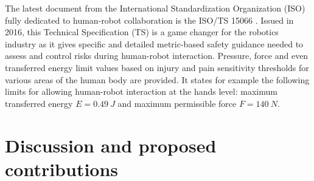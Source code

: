 The latest document from the International Standardization Organization (ISO) fully dedicated to human-robot collaboration is the ISO/TS 15066 \cite{ISO15066PDF}. Issued in 2016, this Technical Specification (TS) is a game changer for the robotics industry as it gives specific and detailed metric-based safety guidance needed to assess and control risks during human-robot interaction. Pressure, force and even transferred energy limit values based on injury and pain sensitivity thresholds for various areas of the human body are provided. It states for example the following limits for allowing human-robot interaction at the hands level: maximum transferred energy $E=0.49~J$ and maximum permissible force $F=140~N$. 
\section{Discussion and proposed contributions}
